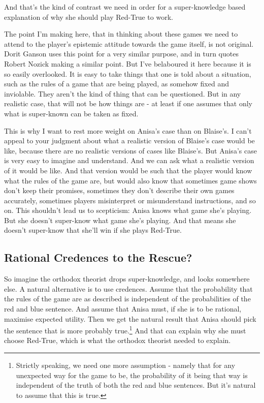 \documentclass[
  11pt,
]{book}
\begin{document}
And that's the kind of contrast we need in order for a super-knowledge based explanation of why she should play Red-True to work.

The point I'm making here, that in thinking about these games we need to attend to the player's epistemic attitude towards the game itself, is not original. Dorit Ganson \citeyearpar{Ganson2019} uses this point for a very similar purpose, and in turn quotes Robert Nozick \citeyearpar{Nozick1981} making a similar point. But I've belaboured it here because it is so easily overlooked. It is easy to take things that one is told about a situation, such as the rules of a game that are being played, as somehow fixed and inviolable. They aren't the kind of thing that can be questioned. But in any realistic case, that will not be how things are - at least if one assumes that only what is super-known can be taken as fixed.

This is why I want to rest more weight on Anisa's case than on Blaise's. I can't appeal to your judgment about what a realistic version of Blaise's case would be like, because there are no realistic versions of cases like Blaise's. But Anisa's case is very easy to imagine and understand. And we can ask what a realistic version of it would be like. And that version would be such that the player would know what the rules of the game are, but would also know that sometimes game shows don't keep their promises, sometimes they don't describe their own games accurately, sometimes players misinterpret or misunderstand instructions, and so on. This shouldn't lead us to scepticism: Anisa knows what game she's playing. But she doesn't super-know what game she's playing. And that means she doesn't super-know that she'll win if she plays Red-True.

\hypertarget{probrescue}{%
\subsection{Rational Credences to the Rescue?}\label{probrescue}}

So imagine the orthodox theorist drops super-knowledge, and looks somewhere else. A natural alternative is to use credences. Assume that the probability that the rules of the game are as described is independent of the probabilities of the red and blue sentence. And assume that Anisa must, if she is to be rational, maximise expected utility. Then we get the natural result that Anisa should pick the sentence that is more probably true.\footnote{Strictly speaking, we need one more assumption - namely that for any unexpected way for the game to be, the probability of it being that way is independent of the truth of both the red and blue sentences. But it's natural to assume that this is true.} And that can explain why she must choose Red-True, which is what the orthodox theorist needed to explain.
\end{document}
